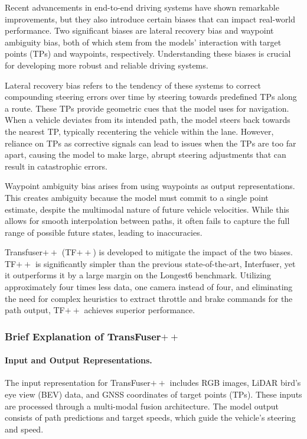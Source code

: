 Recent advancements in end-to-end driving systems have shown remarkable improvements, but they also introduce certain biases that can impact real-world performance. Two significant biases are lateral recovery bias and waypoint ambiguity bias, both of which stem from the models' interaction with target points (TPs) and waypoints, respectively. Understanding these biases is crucial for developing more robust and reliable driving systems.

Lateral recovery bias refers to the tendency of these systems to correct compounding steering errors over time by steering towards predefined TPs along a route. These TPs provide geometric cues that the model uses for navigation. When a vehicle deviates from its intended path, the model steers back towards the nearest TP, typically recentering the vehicle within the lane. However, reliance on TPs as corrective signals can lead to issues when the TPs are too far apart, causing the model to make large, abrupt steering adjustments that can result in catastrophic errors.

Waypoint ambiguity bias arises from using waypoints as output representations. This creates ambiguity because the model must commit to a single point estimate, despite the multimodal nature of future vehicle velocities. While this allows for smooth interpolation between paths, it often fails to capture the full range of possible future states, leading to inaccuracies.

Transfuser$++$ (TF$++$) \cite{jaeger2023hidden} is developed to mitigate the impact of the two biases. TF$++$ is significantly simpler than the previous state-of-the-art, Interfuser, yet it outperforms it by a large margin on the Longest6 benchmark. Utilizing approximately four times less data, one camera instead of four, and eliminating the need for complex heuristics to extract throttle and brake commands for the path output, TF$++$ achieves superior performance.

\subsubsection{Brief Explanation of TransFuser\texorpdfstring{$++$}{++}}

\paragraph{Input and Output Representations.}

The input representation for TransFuser$++$ includes RGB images, LiDAR bird's eye view (BEV) data, and GNSS coordinates of target points (TPs). These inputs are processed through a multi-modal fusion architecture. The model output consists of path predictions and target speeds, which guide the vehicle's steering and speed.

